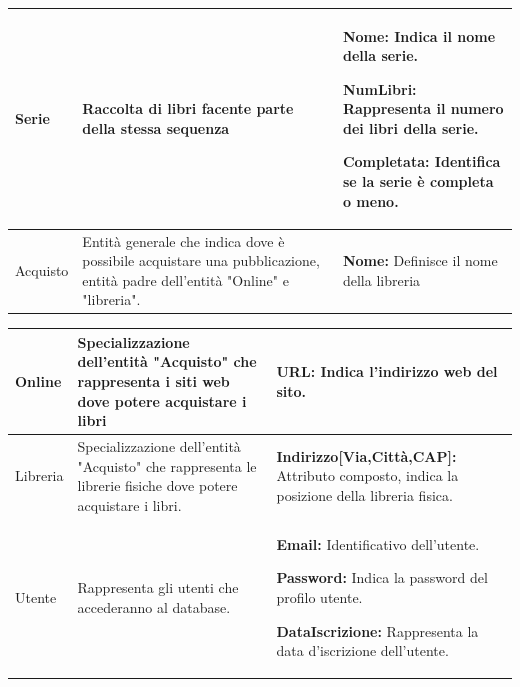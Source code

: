 \begin{center}
\begin{tabular}{ | m{5cm} | m{5cm}| m{6cm} | }
             Serie & Raccolta di libri facente parte della stessa sequenza & 
             {\bf Nome:} Indica il nome della serie.\par
             {\bf NumLibri:} Rappresenta il numero dei libri della serie.\par
             {\bf Completata:} Identifica se la serie è completa o meno.\par\\ 
        \hline
             Acquisto & Entità generale che indica dove è possibile acquistare una pubblicazione, entità padre dell'entità "Online" e "libreria". 
             & 
             {\bf Nome:} Definisce il nome della libreria \par 
             \\ 
            \hline
             \end{tabular}
       \begin{tabular}{ | m{5cm} | m{5cm}| m{6cm} | }   
       \hline
             Online & Specializzazione dell'entità "Acquisto" che rappresenta i siti web dove potere acquistare i libri
             & {\bf URL:} Indica l'indirizzo web del sito.\par\\ 
        \hline
             Libreria & Specializzazione dell'entità "Acquisto" che rappresenta le librerie fisiche dove potere acquistare i libri.
             & 
             {\bf  Indirizzo{\large[Via,Città,CAP]:}} Attributo composto, indica la posizione della libreria fisica.\par 
             \\ 
        \hline
             Utente & Rappresenta gli utenti che accederanno al database.
             & {\bf Email:} Identificativo dell'utente.\par
                {\bf Password:} Indica la password del profilo utente.\par
                {\bf DataIscrizione:} Rappresenta la data d'iscrizione dell'utente.\par\\ 
        \hline
    \end{tabular}



\end{center}
